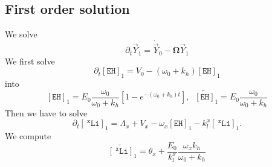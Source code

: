 \documentclass[aps,onecolumn,11pt]{revtex4}
\newcommand{\mychem}[1]{\mathtt{#1}}
\newcommand{\myconc}[1]{\left\lbrack{#1}\right\rbrack}
\newcommand{\spLi}[1]{{~^{\mychem{#1}}\mychem{Li}}}
\newcommand{\Li}[1]{\myconc{\spLi{#1}}}
\newcommand{\spEHin}{\mychem{EH}}
\newcommand{\EHin}{\myconc{\spEHin}}
\newcommand{\mymat}[1]{{\bm{#1}}}
\begin{document}
\subsection{First order solution}
We solve
\begin{equation}
	\partial_t \vec{Y}_1 = \dot{\vec{Y}}_0 - \mymat{\Omega}\vec{Y}_1
\end{equation}
We first solve
\begin{equation}
	\partial_t \EHin_1 = V_0 - \left(\omega_0+k_h\right)  \EHin_1
\end{equation}
into
\begin{equation}
	\EHin_1 = E_0 \dfrac{\omega_0}{\omega_0+k_h}
	\left\lbrack
		 1-e^{-\left(\omega_0+k_h\right) t}
	\right\rbrack,\;\;\widetilde{\EHin}_1 = E_0 \dfrac{\omega_0}{\omega_0+k_h}
\end{equation}
Then we have to solve
\begin{equation}
	\partial_t \Li{x}_1 = \Lambda_x + V_x - \omega_x  \EHin_1 - k_l^x \Li{x}_1.
\end{equation}
We compute
\begin{equation}
	\widetilde{\Li{x}}_1 = \theta_x + \dfrac{E_0}{k_l^x}  \dfrac{\omega_x k_h}{\omega_0+k_h}
\end{equation}
\end{document}
